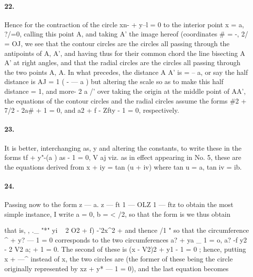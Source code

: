 \documentclass[11pt,a4paper]{book}
\begin{document}
{{{{{\paragraph{22.} Hence  for  the  contraction  of  the  circle  xn-  +  y--l  =  0  to  the  interior  point  x  =  a,
?/=0,  calling  this  point  A,  and  taking  A'  the  image  hereof  (coordinates  \#  =  -,  2/  =  OJ,
we  see  that  the  contour  circles  are  the  circles  all  passing  through  the  antipoints  of
A,  A',  and  having  thus  for  their  common  chord  the  line  bisecting  A  A'  at  right
angles,  and  that  the  radial  circles  are  the  circles  all  passing  through  the  two
points  A,  A.
In    what    precedes,    the     distance    A  A'    is    =  --  a,    or    say    the    half    distance    is
AJ
=  1  (  -  ---  a  )     but   altering   the    scale   so   as   to  make   this   half  distance   =  1,   and   more-
2  a        /'
over  taking  the  origin  at  the  middle  point  of  AA',  the  equations  of  the  contour
circles  and  the  radial  circles  assume  the  forms
\#2  +  7/2  -  2a\#  +  1  =  0,
and
a2  +  f  -  Zfty  -  1  =  0,
respectively.
\paragraph{23.} It   is   better,  interchanging  as,  y  and   altering   the   constants,  to   write   these  in
the  forms
tf  +  y"-(a   )  as  -  1  =  0,
V       aj
viz.  as  in  effect  appearing  in  No.  5,  these  are  the  equations  derived  from  x  +  iy  =  tan  (u  +  iv)
where  tan  u  =  a,  tan  iv  =  ib.
\paragraph{24.} Passing  now  to  the  form
z  ---  a.    z  ---  ft
1  ---  OLZ    1  ---  ftz
to  obtain  the  most  simple  instance,  I  write  a  =  0,  b  =  < /2,  so  that  the  form  is
we  thus  obtain


that  is,
,     .\_
"*"  yi  ~
2  O2  +  f)  -'2x^2  +
and  thence
/1  "
so    that    the    circumference    ^  +  y?  ---  1  =  0     corresponds     to     the    two    circumferences
a?  +  ya  \_  1  =  o,    a?  -f  y2  -  2  V2  a;  +  1  =  0.      The    second    of   these    is    (x  -  V2)2  +  y1  -  1  =  0  ;
hence,  putting  x  +  ---^  instead  of  x,  the  two  circles  are
(the    former    of    these    being    the    circle    originally    represented    by   xz  +  y*  ---  1  =  0),    and
the  last  equation  becomes
}}}}}
\end{document}
